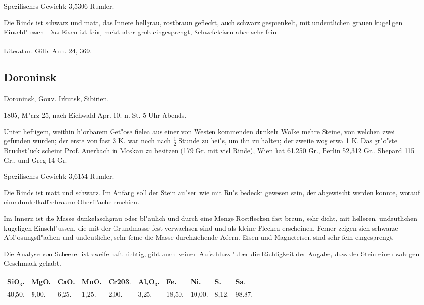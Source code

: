 \documentclass[a4paper, 11pt, oneside]{article}
\begin{document}
Spezifisches Gewicht: 3,5306 Rumler.

Die Rinde ist schwarz und matt, das Innere hellgrau, rostbraun gefleckt, auch schwarz gesprenkelt, mit undeutlichen grauen kugeligen Einschl"ussen. Das Eisen ist fein, meist aber grob eingesprengt, Schwefeleisen aber sehr fein.
\footnotesize
\paragraph{}
Literatur: Gilb. Ann. 24, 369.
\subsection{Doroninsk}
\normalsize
\paragraph{}
Doroninsk, Gouv. Irkutsk, Sibirien.

1805, M"arz 25, nach Eichwald Apr. 10. n. St. 5 Uhr Abends.

Unter heftigem, weithin h"orbarem Get"ose fielen aus einer von Westen kommenden dunkeln Wolke mehre Steine, von welchen zwei gefunden wurden; der erste von fast 3 K. war noch nach $\frac{1}{2}$ Stunde zu hei"s, um ihn zu halten; der zweite wog etwa 1 K. Das gr"o"ste Bruchst"uck scheint Prof. Auerbach in Moskau zu besitzen (179 Gr. mit viel Rinde), Wien hat 61,250 Gr., Berlin 52,312 Gr., Shepard 115 Gr., und Greg 14 Gr.

Spezifisches Gewicht: 3,6154 Rumler.

Die Rinde ist matt und schwarz. Im Anfang soll der Stein au"sen wie mit Ru"s bedeckt gewesen sein, der abgewischt werden konnte, worauf eine dunkelkaffeebraune Oberfl"ache erschien.

Im Innern ist die Masse dunkelaschgrau oder bl"aulich und durch eine Menge Rostflecken fast braun, sehr dicht, mit helleren, undeutlichen kugeligen Einschl"ussen, die mit der Grundmasse fest verwachsen sind und als kleine Flecken erscheinen. Ferner zeigen sich schwarze Abl"osungsfl"achen und undeutliche, sehr feine die Masse durchziehende Adern. Eisen und Magneteisen sind sehr fein eingesprengt.

Die Analyse von Scheerer ist zweifelhaft richtig, gibt auch keinen Aufschluss "uber die Richtigkeit der Angabe, dass der Stein einen salzigen Geschmack gehabt.
\begin{table}[!ht]
    \centering
    \footnotesize
    \begin{tabular}{l l l l l l l l l l}
        SiO$_{3}$. & MgO. & CaO. & MnO. & Cr203. & Al$_{2}$O$_{3}$. & Fe. & Ni. & S. & Sa. \\ \hline
        40,50. & 9,00. & 6,25. & 1,25. & 2,00. & 3,25. & 18,50. & 10,00. & 8,12. & 98.87. \\
    \end{tabular}
\end{table}
\footnotesize
\end{document}
